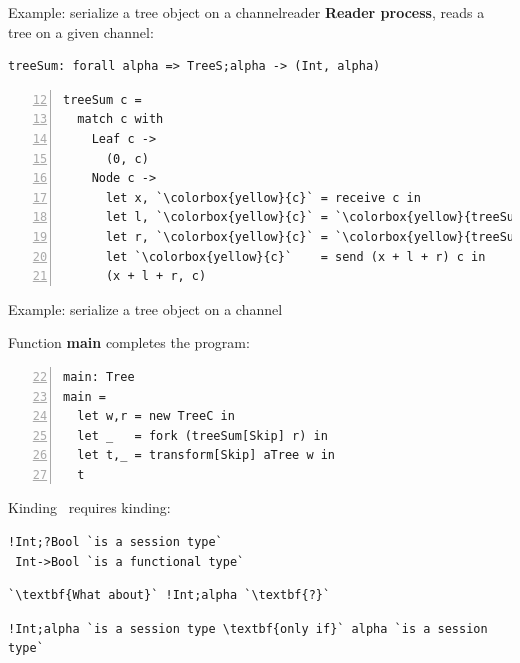 \documentclass[10pt]{beamer}
\begin{document}
\begin{frame}[fragile]{Example:  serialize a tree object on a channel\hfill{\color{mLightBrown}reader}}
	\textbf{Reader process}, reads a tree on a given channel:
	
\begin{lstlisting}
treeSum: forall alpha => TreeS;alpha -> (Int, alpha)
\end{lstlisting}

\label{lst:treeSum}
\begin{lstlisting}[numbers=left,firstnumber=12, xleftmargin=0.7cm, escapeinside=\`\`]
treeSum c =
  match c with
    Leaf c ->
      (0, c)
    Node c ->
      let x, `\colorbox{yellow}{c}` = receive c in
      let l, `\colorbox{yellow}{c}` = `\colorbox{yellow}{treeSum}`[TreeS;!Int;alpha] c in
      let r, `\colorbox{yellow}{c}` = `\colorbox{yellow}{treeSum}`[!Int;alpha] c in
      let `\colorbox{yellow}{c}`    = send (x + l + r) c in
      (x + l + r, c)
\end{lstlisting}

\end{frame}

\begin{frame}[fragile]{Example:  serialize a tree object on a channel}

Function \textbf{main} completes the program:

\begin{lstlisting}[numbers=left,firstnumber=22, xleftmargin=0.7cm]
main: Tree
main =
  let w,r = new TreeC in
  let _   = fork (treeSum[Skip] r) in
  let t,_ = transform[Skip] aTree w in
  t
\end{lstlisting}
\end{frame}

\begin{frame}[fragile]{Kinding}
	\freest\ requires kinding:
\begin{lstlisting}[escapeinside=\`\`]
!Int;?Bool `is a session type`
 Int->Bool `is a functional type`
\end{lstlisting}

\pause
\begin{tcolorbox}
\begin{lstlisting}[escapeinside=\`\`]
`\textbf{What about}` !Int;alpha `\textbf{?}`
\end{lstlisting}

\begin{lstlisting}[escapeinside=\`\`]
!Int;alpha `is a session type \textbf{only if}` alpha `is a session type`
\end{lstlisting}

\end{tcolorbox}		
\end{frame}
\end{document}
